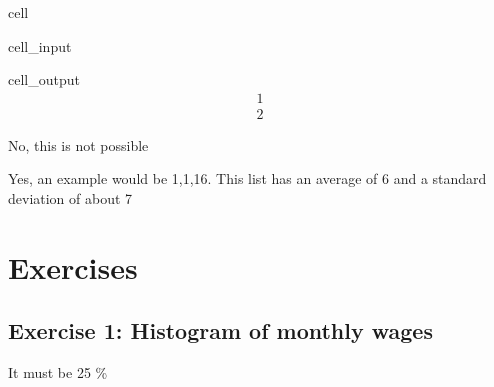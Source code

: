 \documentclass[letterpaper,10pt,english]{jupyterBook}
\begin{document}
\begin{sphinxuseclass}{cell}\begin{sphinxVerbatimInput}

\begin{sphinxuseclass}{cell_input}
\begin{sphinxVerbatim}[commandchars=\\\{\}]
\end{sphinxVerbatim}

\end{sphinxuseclass}\end{sphinxVerbatimInput}
\begin{sphinxVerbatimOutput}

\begin{sphinxuseclass}{cell_output}\begin{equation*}
\begin{split}1\end{split}
\end{equation*}\begin{equation*}
\begin{split}2\end{split}
\end{equation*}
\end{sphinxuseclass}\end{sphinxVerbatimOutput}

\end{sphinxuseclass}
\sphinxAtStartPar
No, this is not possible

\sphinxAtStartPar
Yes, an example would be 1,1,16. This list has an average of 6 and a standard deviation of about 7


\section{Exercises}
\label{\detokenize{exercises_unit_2:exercises}}

\subsection{Exercise 1: Histogram of monthly wages}
\label{\detokenize{exercises_unit_2:exercise-1-histogram-of-monthly-wages}}
\sphinxAtStartPar
It must be 25 \%
\end{document}
